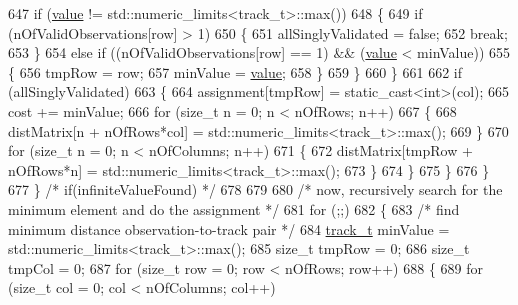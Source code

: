 \begin{DoxyCode}
647                     \textcolor{keywordflow}{if} (\mbox{\hyperlink{struct_g_m_l__token_a50b20988e3fe419332313e8d9e02c775}{value}} != std::numeric\_limits<track\_t>::max())
648                     \{
649                         \textcolor{keywordflow}{if} (nOfValidObservations[row] > 1)
650                         \{
651                             allSinglyValidated = \textcolor{keyword}{false};
652                             \textcolor{keywordflow}{break};
653                         \}
654                         \textcolor{keywordflow}{else} \textcolor{keywordflow}{if} ((nOfValidObservations[row] == 1) && (\mbox{\hyperlink{struct_g_m_l__token_a50b20988e3fe419332313e8d9e02c775}{value}} < minValue))
655                         \{
656                             tmpRow = row;
657                             minValue = \mbox{\hyperlink{struct_g_m_l__token_a50b20988e3fe419332313e8d9e02c775}{value}};
658                         \}
659                     \}
660                 \}
661 
662                 \textcolor{keywordflow}{if} (allSinglyValidated)
663                 \{
664                     assignment[tmpRow] = \textcolor{keyword}{static\_cast<}\textcolor{keywordtype}{int}\textcolor{keyword}{>}(col);
665                     cost += minValue;
666                     \textcolor{keywordflow}{for} (\textcolor{keywordtype}{size\_t} n = 0; n < nOfRows; n++)
667                     \{
668                         distMatrix[n + nOfRows*col] = std::numeric\_limits<track\_t>::max();
669                     \}
670                     \textcolor{keywordflow}{for} (\textcolor{keywordtype}{size\_t} n = 0; n < nOfColumns; n++)
671                     \{
672                         distMatrix[tmpRow + nOfRows*n] = std::numeric\_limits<track\_t>::max();
673                     \}
674                 \}
675             \}
676         \}
677     \} \textcolor{comment}{/* if(infiniteValueFound) */}
678 
679 
680     \textcolor{comment}{/* now, recursively search for the minimum element and do the assignment */}
681     \textcolor{keywordflow}{for} (;;)
682     \{
683         \textcolor{comment}{/* find minimum distance observation-to-track pair */}
684         \mbox{\hyperlink{defines_8h_a7ce9c8817b42ab418e61756f579549ab}{track\_t}} minValue = std::numeric\_limits<track\_t>::max();
685         \textcolor{keywordtype}{size\_t} tmpRow = 0;
686         \textcolor{keywordtype}{size\_t} tmpCol = 0;
687         \textcolor{keywordflow}{for} (\textcolor{keywordtype}{size\_t} row = 0; row < nOfRows; row++)
688         \{
689             \textcolor{keywordflow}{for} (\textcolor{keywordtype}{size\_t} col = 0; col < nOfColumns; col++)

\end{DoxyCode}
